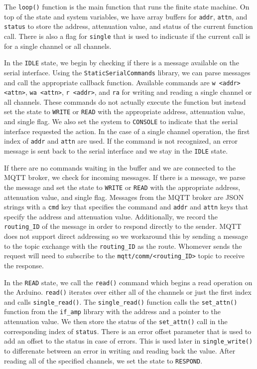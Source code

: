 The \texttt{loop()} function is the main function that runs the finite state machine.
On top of the state and system variables, we have array buffers for \texttt{addr}, \texttt{attn}, and \texttt{status} to store the address, attenuation value, and status of the current function call. 
There is also a flag for \texttt{single} that is used to indicuate if the current call is for a single channel or all channels.

In the \texttt{IDLE} state, we begin by checking if there is a message available on the serial interface. 
Using the \texttt{StaticSerialCommands} library, we can parse messages and call the appropriate callback function. 
Available commands are \texttt{w <addr> <attn>}, \texttt{wa <attn>}, \texttt{r <addr>}, and \texttt{ra} for writing and reading a single channel or all channels.
These commands do not actually execute the function but instead set the state to \texttt{WRITE} or \texttt{READ} with the appropriate address, attenuation value, and single flag.
We also set the system to \texttt{CONSOLE} to indicate that the serial interface requested the action.
In the case of a single channel operation, the first index of \texttt{addr} and \texttt{attn} are used. 
If the command is not recognized, an error message is sent back to the serial interface and we stay in the \texttt{IDLE} state.

If there are no commands waiting in the buffer and we are connected to the MQTT broker, we check for incoming messages.
If there is a message, we parse the message and set the state to \texttt{WRITE} or \texttt{READ} with the appropriate address, attenuation value, and single flag.
Messages from the MQTT broker are JSON strings with a \texttt{cmd} key that specifies the command and \texttt{addr} and \texttt{attn} keys that specify the address and attenuation value.
Additionally, we record the \texttt{routing\_ID} of the message in order to respond directly to the sender.
MQTT does not support direct addressing so we workaround this by sending a message to the topic exchange with the \texttt{routing\_ID} as the route. 
Whomever sends the request will need to subscribe to the \texttt{mqtt/comm/<routing\_ID>} topic to receive the response.

In the \texttt{READ} state, we call the \texttt{read()} command which begins a read operation on the Arduino. 
\texttt{read()} iterates over either all of the channels or just the first index and calls \texttt{single\_read()}.
The \texttt{single\_read()} function calls the \texttt{set\_attn()} function from the \texttt{if\_amp} library with the address and a pointer to the attenuation value.
We then store the status of the \texttt{set\_attn()} call in the corresponding index of \texttt{status}.
There is an error offset parameter that is used to add an offset to the status in case of errors.
This is used later in \texttt{single\_write()} to differenate between an error in writing and reading back the value. 
After reading all of the specified channels, we set the state to \texttt{RESPOND}.

